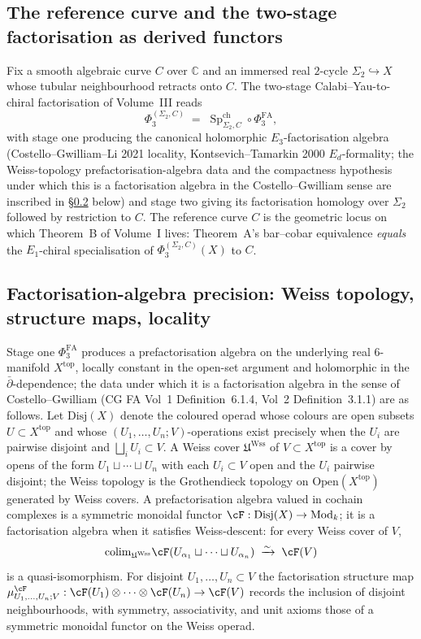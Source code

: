 \documentclass[11pt,reqno]{amsart}
\theoremstyle{plain}
\theoremstyle{definition}
\theoremstyle{remark}
\DeclareMathOperator{\Sp}{Sp}
\DeclareMathOperator{\Mod}{Mod}
\newcommand{\Cbb}{\mathbb{C}}
\begin{document}
\subsection{The reference curve and the two-stage factorisation as derived functors}
\label{subsec:two-stage-derived}
Fix a smooth algebraic curve $C$ over $\Cbb$ and an immersed real $2$-cycle $\Sigma_2 \hookrightarrow X$ whose tubular neighbourhood retracts onto $C$. The two-stage Calabi--Yau-to-chiral factorisation of Volume~III reads
\[
  \Phi_3^{(\Sigma_2,C)} \;=\; \Sp^{\mathrm{ch}}_{\Sigma_2, C} \circ \Phi^{\mathrm{FA}}_3,
\]
with stage one producing the canonical holomorphic $E_3$-factorisation algebra (Costello--Gwilliam--Li 2021 locality, Kontsevich--Tamarkin 2000 $E_d$-formality; the Weiss-topology prefactorisation-algebra data and the compactness hypothesis under which this is a factorisation algebra in the Costello--Gwilliam sense are inscribed in \S\ref{sub:fa-precision} below) and stage two giving its factorisation homology over $\Sigma_2$ followed by restriction to $C$. The reference curve $C$ is the geometric locus on which Theorem~B of Volume~I lives: Theorem~A's bar--cobar equivalence \emph{equals} the $E_1$-chiral specialisation of $\Phi_3^{(\Sigma_2,C)}(X)$ to $C$.

\subsection{Factorisation-algebra precision: Weiss topology, structure maps, locality}
\label{sub:fa-precision}
Stage one $\Phi^{\mathrm{FA}}_3$ produces a prefactorisation algebra on the underlying real $6$-manifold $X^{\mathrm{top}}$, locally constant in the open-set argument and holomorphic in the $\bar\partial$-dependence; the data under which it is a factorisation algebra in the sense of Costello--Gwilliam (CG FA Vol~1 Definition~6.1.4, Vol~2 Definition~3.1.1) are as follows. Let $\mathrm{Disj}(X)$ denote the coloured operad whose colours are open subsets $U \subset X^{\mathrm{top}}$ and whose $(U_1, \ldots, U_n; V)$-operations exist precisely when the $U_i$ are pairwise disjoint and $\bigsqcup_i U_i \subset V$. A Weiss cover $\mathfrak{U}^{\mathrm{Wss}}$ of $V \subset X^{\mathrm{top}}$ is a cover by opens of the form $U_1 \sqcup \cdots \sqcup U_n$ with each $U_i \subset V$ open and the $U_i$ pairwise disjoint; the Weiss topology is the Grothendieck topology on $\mathrm{Open}(X^{\mathrm{top}})$ generated by Weiss covers. A prefactorisation algebra valued in cochain complexes is a symmetric monoidal functor $\cF : \mathrm{Disj}(X) \to \Mod_k$; it is a factorisation algebra when it satisfies Weiss-descent: for every Weiss cover of $V$,
\[
  \mathrm{colim}_{\mathfrak{U}^{\mathrm{Wss}}} \cF(U_{\alpha_1} \sqcup \cdots \sqcup U_{\alpha_n}) \;\xrightarrow{\sim}\; \cF(V)
\]
is a quasi-isomorphism. For disjoint $U_1, \ldots, U_n \subset V$ the factorisation structure map $\mu^{\cF}_{U_1, \ldots, U_n; V} : \cF(U_1) \otimes \cdots \otimes \cF(U_n) \to \cF(V)$ records the inclusion of disjoint neighbourhoods, with symmetry, associativity, and unit axioms those of a symmetric monoidal functor on the Weiss operad.
\end{document}
